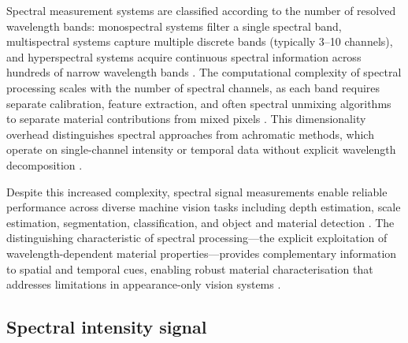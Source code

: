 \documentclass[12pt,a4paper,oneside]{report}
\begin{document}
Spectral measurement systems are classified according to the number of resolved wavelength bands: monospectral systems filter a single spectral band, multispectral systems capture multiple discrete bands (typically 3–10 channels), and hyperspectral systems acquire continuous spectral information across hundreds of narrow wavelength bands \cite{heinz2001,vasile2023}. The computational complexity of spectral processing scales with the number of spectral channels, as each band requires separate calibration, feature extraction, and often spectral unmixing algorithms to separate material contributions from mixed pixels \cite{heinz2001}. This dimensionality overhead distinguishes spectral approaches from achromatic methods, which operate on single-channel intensity or temporal data without explicit wavelength decomposition \cite{su2016,becker2023}.

Despite this increased complexity, spectral signal measurements enable reliable performance across diverse machine vision tasks including depth estimation, scale estimation, segmentation, classification, and object and material detection \cite{vasile2023,elachi2021}. The distinguishing characteristic of spectral processing—the explicit exploitation of wavelength-dependent material properties—provides complementary information to spatial and temporal cues, enabling robust material characterisation that addresses limitations in appearance-only vision systems \cite{heinz2001,vasile2023}.

\subsection{Spectral intensity signal}
\label{subsec:spectral_intensity_signal}
\end{document}
